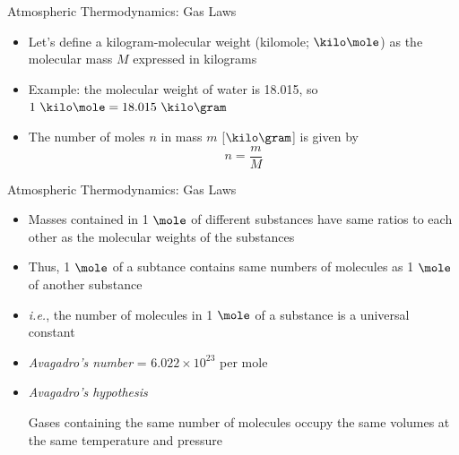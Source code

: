 \begin{frame}{Atmospheric Thermodynamics: Gas Laws}
\begin{itemize}
	\item Let's define a kilogram-molecular weight (kilomole; $\kilo\mole$) as the molecular mass $M$ expressed in kilograms
	\item Example: the molecular weight of water is 18.015, so $1\ \kilo\mole = 18.015\ \kilo\gram$
	\item The number of moles $n$ in mass $m$ [$\kilo\gram$] is given by
	$$n = \frac{m}{M}$$
\end{itemize}
\end{frame}
\begin{frame}{Atmospheric Thermodynamics: Gas Laws}
\begin{itemize}
	\item Masses contained in 1 $\mole$ of different substances have same ratios to each other as the molecular weights of the substances
	\item Thus, 1 $\mole$ of a subtance contains same numbers of molecules as 1 $\mole$ of another substance
	\item \textit{i.e.}, the number of molecules in 1 $\mole$ of a substance is a universal constant
	\item \textit{Avagadro's number} = $6.022 \times 10^{23}$ per mole
	\item \textit{Avagadro's hypothesis}
	\begin{fancydefs}
		Gases containing the same number of molecules
		occupy the same volumes at the same temperature
		and pressure
	\end{fancydefs}
\end{itemize}
\end{frame}

